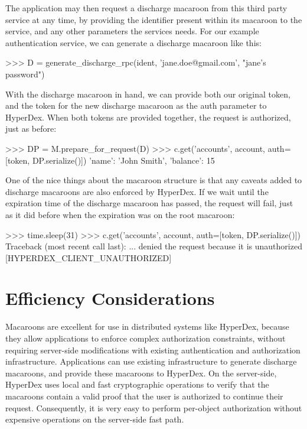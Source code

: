 The application may then request a discharge macaroon from this third party
service at any time, by providing the identifier present within its macaroon to
the service, and any other parameters the services needs.  For our example
authentication service, we can generate a discharge macaroon like this:

\begin{pythoncode}
>>> D = generate_discharge_rpc(ident, 'jane.doe@gmail.com', "jane's password")
\end{pythoncode}

With the discharge macaroon in hand, we can provide both our original token, and
the token for the new discharge macaroon as the auth parameter to HyperDex.
When both tokens are provided together, the request is authorized, just as
before:

\begin{pythoncode}
>>> DP = M.prepare_for_request(D)
>>> c.get('accounts', account, auth=[token, DP.serialize()])
{'name': 'John Smith', 'balance': 15}
\end{pythoncode}

One of the nice things about the macaroon structure is that any caveats added to
discharge macaroons are also enforced by HyperDex.  If we wait until the
expiration time of the discharge macaroon has passed, the request will fail,
just as it did before when the expiration was on the root macaroon:

\begin{pythoncode}
>>> time.sleep(31)
>>> c.get('accounts', account, auth=[token, DP.serialize()])
Traceback (most recent call last):
... denied the request because it is unauthorized [HYPERDEX_CLIENT_UNAUTHORIZED]
\end{pythoncode}

\section{Efficiency Considerations}

Macaroons are excellent for use in distributed systems like HyperDex, because
they allow applications to enforce complex authorization constraints, without
requiring server-side modifications with existing authentication and
authorization infrastructure.  Applications can use existing infrastructure to
generate discharge macaroons, and provide these macaroons to HyperDex.  On the
server-side, HyperDex uses local and fast cryptographic operations to verify
that the macaroons contain a valid proof that the user is authorized to continue
their request.  Consequently, it is very easy to perform per-object
authorization without expensive operations on the server-side fast path.

